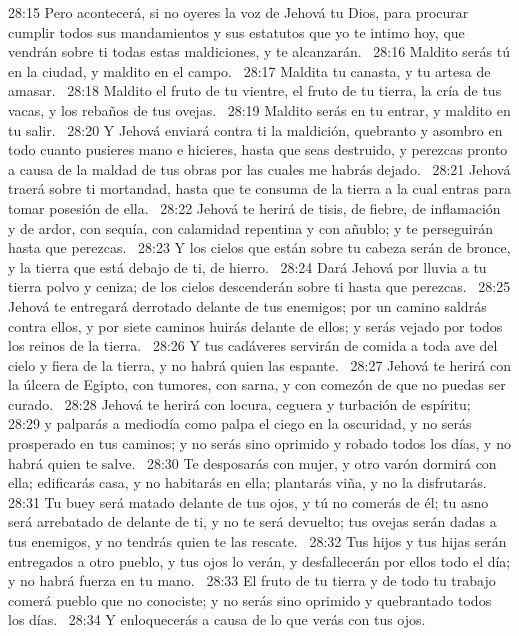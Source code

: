 28:15 Pero acontecerá, si no oyeres la voz de Jehová tu Dios, para procurar cumplir todos sus mandamientos y sus estatutos que yo te intimo hoy, que vendrán sobre ti todas estas maldiciones, y te alcanzarán.  
28:16 Maldito serás tú en la ciudad, y maldito en el campo.  
28:17 Maldita tu canasta, y tu artesa de amasar.  
28:18 Maldito el fruto de tu vientre, el fruto de tu tierra, la cría de tus vacas, y los rebaños de tus ovejas.  
28:19 Maldito serás en tu entrar, y maldito en tu salir.  
28:20 Y Jehová enviará contra ti la maldición, quebranto y asombro en todo cuanto pusieres mano e hicieres, hasta que seas destruido, y perezcas pronto a causa de la maldad de tus obras por las cuales me habrás dejado.  
28:21 Jehová traerá sobre ti mortandad, hasta que te consuma de la tierra a la cual entras para tomar posesión de ella.  
28:22 Jehová te herirá de tisis, de fiebre, de inflamación y de ardor, con sequía, con calamidad repentina y con añublo; y te perseguirán hasta que perezcas.  
28:23 Y los cielos que están sobre tu cabeza serán de bronce, y la tierra que está debajo de ti, de hierro.  
28:24 Dará Jehová por lluvia a tu tierra polvo y ceniza; de los cielos descenderán sobre ti hasta que perezcas.  
28:25 Jehová te entregará derrotado delante de tus enemigos; por un camino saldrás contra ellos, y por siete caminos huirás delante de ellos; y serás vejado por todos los reinos de la tierra.  
28:26 Y tus cadáveres servirán de comida a toda ave del cielo y fiera de la tierra, y no habrá quien las espante.  
28:27 Jehová te herirá con la úlcera de Egipto, con tumores, con sarna, y con comezón de que no puedas ser curado.  
28:28 Jehová te herirá con locura, ceguera y turbación de espíritu;  
28:29 y palparás a mediodía como palpa el ciego en la oscuridad, y no serás prosperado en tus caminos; y no serás sino oprimido y robado todos los días, y no habrá quien te salve.  
28:30 Te desposarás con mujer, y otro varón dormirá con ella; edificarás casa, y no habitarás en ella; plantarás viña, y no la disfrutarás.  
28:31 Tu buey será matado delante de tus ojos, y tú no comerás de él; tu asno será arrebatado de delante de ti, y no te será devuelto; tus ovejas serán dadas a tus enemigos, y no tendrás quien te las rescate.  
28:32 Tus hijos y tus hijas serán entregados a otro pueblo, y tus ojos lo verán, y desfallecerán por ellos todo el día; y no habrá fuerza en tu mano.  
28:33 El fruto de tu tierra y de todo tu trabajo comerá pueblo que no conociste; y no serás sino oprimido y quebrantado todos los días.  
28:34 Y enloquecerás a causa de lo que verás con tus ojos.  

